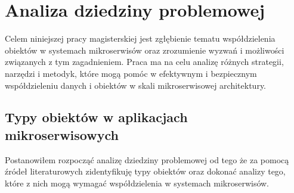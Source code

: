 \documentclass[runningheads,12pt]{llncs} \usepackage{graphicx} \usepackage{todonotes} \usepackage{fancyhdr} \usepackage{lipsum} \usepackage[T1]{fontenc} \usepackage[provide=*,english,polish]{babel}
\begin{document}
\newpage

\section{Analiza dziedziny problemowej} 

Celem niniejszej pracy magisterskiej jest zgłębienie tematu współdzielenia obiektów w systemach mikroserwisów oraz zrozumienie wyzwań i możliwości związanych z tym zagadnieniem. Praca ma na celu analizę różnych strategii, narzędzi i metodyk, które mogą pomóc w efektywnym i bezpiecznym współdzieleniu danych i obiektów w skali mikroserwisowej architektury.

\subsection{Typy obiektów w aplikacjach mikroserwisowych}

Postanowiłem rozpocząć analizę dziedziny problemowej od tego że za pomocą źródeł literaturowych zidentyfikuję typy obiektów oraz dokonać analizy tego, które z nich mogą wymagać współdzielenia w systemach mikroserwisów.
\end{document}
